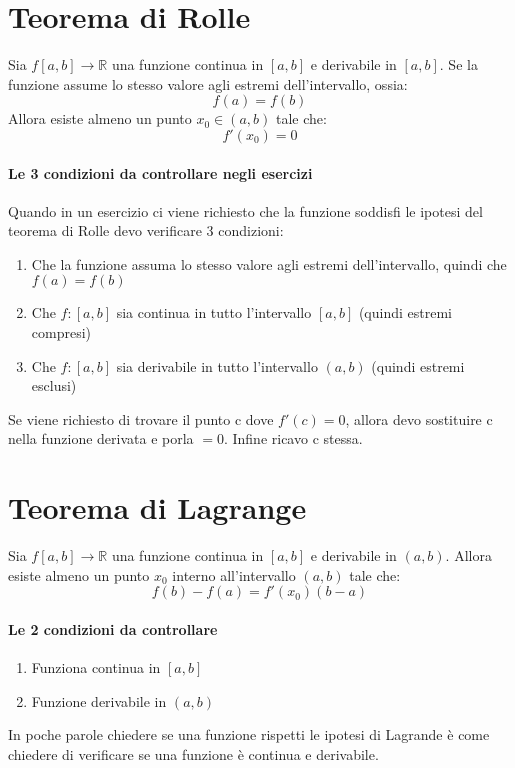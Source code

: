 \section{Teorema di Rolle}
Sia $f[a,b]\rightarrow \mathbb{R}$ una funzione continua in $[a,b]$ e
derivabile in $[a,b]$. Se la funzione assume lo stesso valore agli estremi
dell'intervallo, ossia:
\[
	f(a)=f(b)
\]
Allora esiste almeno un punto $x_0 \in (a, b)$ tale che:
\[
	f'(x_0) = 0
\]
\paragraph*{Le 3 condizioni da controllare negli esercizi}
Quando in un esercizio ci viene richiesto che la funzione soddisfi le ipotesi del
teorema di Rolle devo verificare 3 condizioni:
\begin{enumerate}
	\item Che la funzione assuma lo stesso valore agli estremi dell'intervallo, quindi che $f(a) = f(b)$
	\item Che $f:[a,b]$ sia continua in tutto l'intervallo $[a,b]$ (quindi estremi compresi)
	\item Che $f:[a,b]$ sia derivabile in tutto l'intervallo $(a,b)$ (quindi estremi esclusi)
\end{enumerate}
Se viene richiesto di trovare il punto c dove $f'(c) = 0$, allora devo
sostituire c nella funzione derivata e porla $= 0$. Infine ricavo c stessa.

\section{Teorema di Lagrange}
Sia $f[a,b]\rightarrow \mathbb{R}$ una funzione continua in $[a,b]$ e derivabile 
in $(a,b)$. Allora esiste almeno un punto $x_0$ interno all'intervallo $(a,b)$ tale che:
\[
	f(b) - f(a) = f'(x_0)(b-a)
\]
\paragraph*{Le 2 condizioni da controllare}
\begin{enumerate}
	\item Funziona continua in $[a,b]$
	\item Funzione derivabile in $(a,b)$
\end{enumerate}
In poche parole chiedere se una funzione rispetti le ipotesi di Lagrande è come
chiedere di verificare se una funzione è continua e derivabile.

